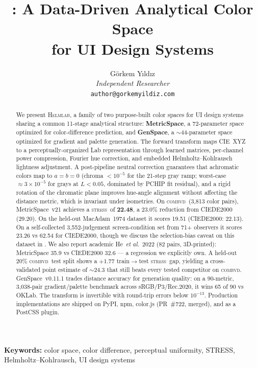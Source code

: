 \documentclass[11pt, twocolumn]{article}
\title{\helmlab: A Data-Driven Analytical Color Space\\for UI Design Systems}
\author{
  G\"orkem Y{\i}ld{\i}z\\
  \textit{Independent Researcher}\\
  \texttt{author@gorkemyildiz.com}
}
\date{}
\newcommand{\helmlab}{\textsc{Helmlab}}
\newcommand{\stress}{\textsc{stress}}
\newcommand{\combvd}{\textsc{combvd}}
\newcommand{\etal}{\textit{et al.}}
\begin{document}
\maketitle

\begin{abstract}
We present \helmlab, a family of two purpose-built color spaces for
UI design systems sharing a common 11-stage analytical structure:
\textbf{MetricSpace}, a 72-parameter space optimized for color-difference
prediction, and \textbf{GenSpace}, a $\sim$44-parameter space optimized
for gradient and palette generation. The forward transform maps
CIE~XYZ to a perceptually-organized Lab representation through
learned matrices, per-channel power compression, Fourier hue
correction, and embedded Helmholtz--Kohlrausch lightness adjustment.
A post-pipeline neutral correction guarantees that achromatic colors
map to $a\!=\!b\!=\!0$ (chroma $<10^{-5}$ for the 21-step gray ramp; worst-case $\approx 3\!\times\!10^{-5}$ for grays at $L\!<\!0.05$, dominated by PCHIP fit residual), and a rigid rotation of
the chromatic plane improves hue-angle alignment without affecting
the distance metric, which is invariant under isometries.
On \combvd\ (3{,}813 color pairs), MetricSpace~v21 achieves a
\stress\ of \textbf{22.48}, a 23.0\% reduction from CIEDE2000
(29.20). On the held-out MacAdam~1974 dataset it scores 19.51
(CIEDE2000: 22.13). On a self-collected 3{,}552-judgement
screen-condition set from 71+ observers it scores 23.26 vs
62.54 for CIEDE2000, though we discuss the selection-bias caveat
on this dataset in . We also report academic
He~\etal\ 2022 (82 pairs, 3D-printed): MetricSpace 35.9 vs
CIEDE2000 32.6 --- a regression we explicitly own.
A held-out 20\% \combvd\ test split shows a $+1.77$
train$\to$test \stress\ gap, yielding a cross-validated point
estimate of $\sim$24.3 that still beats every tested competitor on
\combvd.
GenSpace~v0.11.1 trades distance accuracy for generation quality:
on a 90-metric, 3{,}038-pair gradient/palette benchmark across
sRGB/P3/Rec.2020, it wins 65 of 90 vs OKLab. The transform is
invertible with round-trip errors below $10^{-13}$. Production
implementations are shipped on PyPI, npm, color.js (PR~\#722, merged),
and as a PostCSS plugin.
\end{abstract}

\textbf{Keywords:} color space, color difference, perceptual uniformity, STRESS, Helmholtz--Kohlrausch, UI design systems
\end{document}
